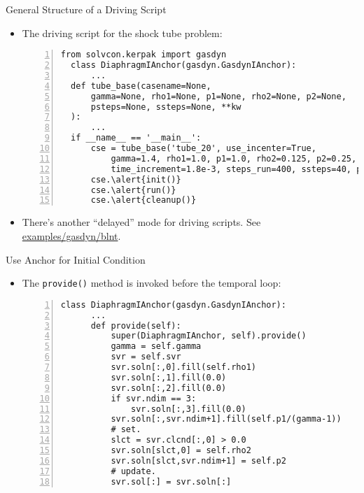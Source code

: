 \documentclass[dvips,xcolor=pst,14pt]{beamer}
\begin{document}
\begin{frame}[fragile]{
%
General Structure of a Driving Script
%
}
\begin{itemize}
  \item The driving script for the shock tube problem:
  \begin{Verbatim}[frame=single,numbers=left,fontsize=\scriptsize,commandchars=\\\{\}]
  from solvcon.kerpak import gasdyn
  class DiaphragmIAnchor(gasdyn.GasdynIAnchor):
      ...
  def tube_base(casename=None,
      gamma=None, rho1=None, p1=None, rho2=None, p2=None,
      psteps=None, ssteps=None, **kw
  ):
      ...
  if __name__ == '__main__':
      cse = tube_base('tube_20', use_incenter=True,
          gamma=1.4, rho1=1.0, p1=1.0, rho2=0.125, p2=0.25,
          time_increment=1.8e-3, steps_run=400, ssteps=40, psteps=1)
      cse.\alert{init()}
      cse.\alert{run()}
      cse.\alert{cleanup()}
  \end{Verbatim}
  \item There's another ``delayed'' mode for driving scripts.  See
  \href{https://bitbucket.org/solvcon/solvcon/src/09bcbc949751/examples/gasdyn/blnt}{examples/gasdyn/blnt}.
\end{itemize}
\end{frame}

\begin{frame}[fragile]{
%
Use Anchor for Initial Condition
%
}
\begin{itemize} \small
  \item The \texttt{provide()} method is invoked before the temporal loop:
  \begin{Verbatim}[frame=single,numbers=left,fontsize=\scriptsize,commandchars=\\\{\}]
  class DiaphragmIAnchor(gasdyn.GasdynIAnchor):
      ...
      def provide(self):
          super(DiaphragmIAnchor, self).provide()
          gamma = self.gamma
          svr = self.svr
          svr.soln[:,0].fill(self.rho1)
          svr.soln[:,1].fill(0.0)
          svr.soln[:,2].fill(0.0)
          if svr.ndim == 3:
              svr.soln[:,3].fill(0.0)
          svr.soln[:,svr.ndim+1].fill(self.p1/(gamma-1))
          # set.
          slct = svr.clcnd[:,0] > 0.0
          svr.soln[slct,0] = self.rho2
          svr.soln[slct,svr.ndim+1] = self.p2
          # update.
          svr.sol[:] = svr.soln[:]
  \end{Verbatim}
\end{itemize}
\end{frame}
\end{document}

